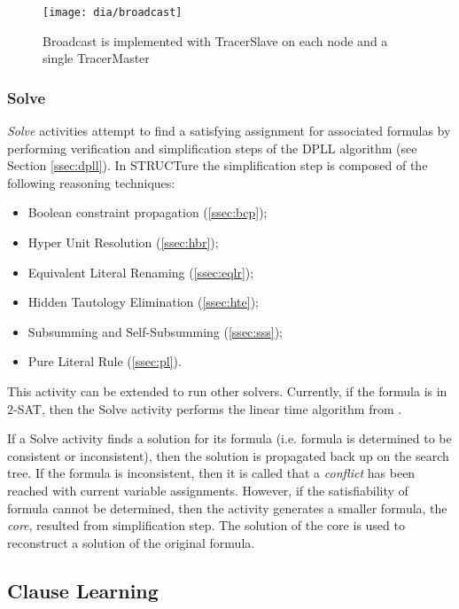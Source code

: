 \begin{figure}[h]
  \centering
  \texttt{[image: dia/broadcast]}
  \caption{Broadcast is implemented with
  TracerSlave on each node and a single TracerMaster}
  \label{fig:broadcast}
\end{figure}


\subsubsection{Solve}
\label{sssec:solve}

\emph{Solve} activities attempt to find a satisfying assignment for
associated formulas by performing verification and simplification
steps of the DPLL algorithm (see Section \ref{ssec:dpll}).
In STRUCTure the simplification step is composed of the following
reasoning techniques:
\begin{itemize}
  \item Boolean constraint propagation (\ref{ssec:bcp});
  \item Hyper Unit Resolution (\ref{ssec:hbr});
  \item Equivalent Literal Renaming (\ref{ssec:eqlr});
  \item Hidden Tautology Elimination (\ref{ssec:hte});
  \item Subsumming and Self-Subsumming (\ref{ssec:sss});
  \item Pure Literal Rule (\ref{ssec:pl}).
\end{itemize}

This activity can be extended to run other solvers. Currently,
if the formula is in $2$-SAT, then the Solve activity performs the
linear time algorithm from \cite{mine:tarjan}.

If a Solve activity finds a solution for its formula (i.e.  formula
is determined to be consistent or inconsistent), then the solution is
propagated back up on the search tree. If the formula is inconsistent,
then it is called that a \emph{conflict} has been reached with current
variable assignments.  However, if the satisfiability of formula
cannot be determined, then the activity generates a smaller formula,
the \emph{core}, resulted from simplification step. The solution of
the core is used to reconstruct a solution of the original formula.


\subsection{Clause Learning}
\label{ssec:learning}

